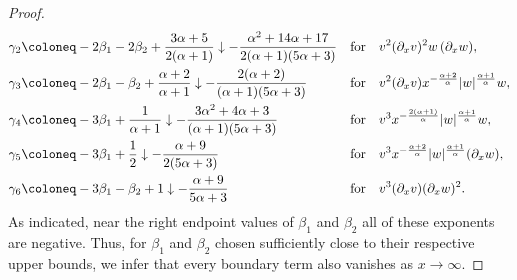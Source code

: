 \documentclass[reqno,12pt]{amsart}
\numberwithin{equation}{section}
\begin{document}
\begin{proof}
\begin{align*}
\gamma_2 &\coloneq -2\beta_1-2\beta_2+\frac{%
3\alpha+5}{2(\alpha+1)} \downarrow - \frac{\alpha^2+14\alpha+17}{2(\alpha+1)(5\alpha+3)} && \text{for} \quad v^2(\partial_x v)^2 w\,(\partial_x w), \\
\gamma_3 &\coloneq -2\beta_1-\beta_2+\frac{\alpha+2}{\alpha+1} \downarrow - \frac{2(\alpha+2)}{(\alpha+1)(5\alpha+3)} && \text{for} \quad v^2(\partial_x v)x^{-\frac{\alpha+2}{\alpha}}|w|^{\frac{\alpha+1}{\alpha}}w, \\
\gamma_4 &\coloneq -3\beta_1+\frac1{\alpha+1} \downarrow - \frac{3\alpha^2+4\alpha+3}{(\alpha+1)(5\alpha+3)} && \text{for} \quad v^3 x^{-\frac{2(\alpha+1)}{\alpha}}|w|^{\frac{\alpha+1}{\alpha}}w,\\
\gamma_5 &\coloneq -3\beta_1+\frac12 \downarrow - \frac{\alpha+9}{2(5\alpha+3)} && \text{for} \quad v^3 x^{-\frac{\alpha+2}{\alpha}}|w|^{\frac{\alpha+1}{\alpha}} (\partial_x w), \\
\gamma_6 &\coloneq-3\beta_1-\beta_2+1 \downarrow - \frac{\alpha+9}{5\alpha+3} && \text{for} \quad v^3 (\partial_x v)(\partial_x w)^2.
\end{align*}
%
As indicated, near the right endpoint values of $\beta_1$ and $\beta_2$ all of these exponents are negative. Thus, for $\beta_1$ and $\beta_2$ chosen sufficiently
close to their respective upper bounds, we infer that every boundary term also vanishes as $x\to\infty$.

%
\bigskip
%


\end{proof}
\end{document}
